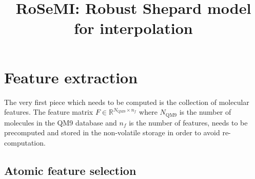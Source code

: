 \documentclass[12pt]{article}
\title{RoSeMI: Robust Shepard model for interpolation}
\begin{document}
\maketitle


\section{Feature extraction}
\label{sec:feature}
The very first piece which needs to be computed is the collection of molecular features. The feature matrix $F \in \mathbb{R}^{N_\text{QM9} \times n_f}$ where $N_\text{QM9}$ is the number of molecules in the QM9 database and $n_f$ is the number of features, needs to be precomputed and stored in the non-volatile storage in order to avoid re-computation.
\subsection{Atomic feature selection}
\end{document}
